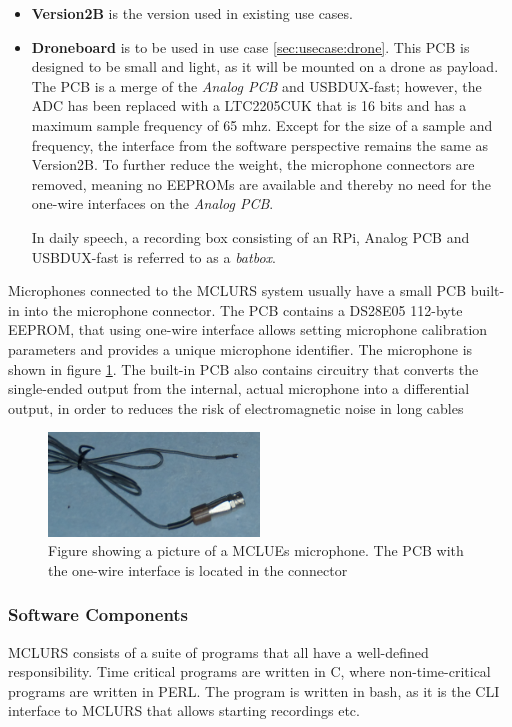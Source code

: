 \begin{itemize}
	\item \textbf{Version2B} is the version used in existing use cases. 

	\item \textbf{Droneboard} is to be used in use case \ref{sec:usecase:drone}. This PCB is designed to be small and light, as it will be mounted on a drone as payload. The PCB is a merge of the \textit{Analog PCB} and USBDUX-fast; however, the ADC has been replaced with a LTC2205CUK\citep{ADC:LTC2205} that is 16 bits and has a maximum sample frequency of 65 mhz. Except for the size of a sample and frequency, the interface from the software perspective remains the same as Version2B. To further reduce the weight, the microphone connectors are removed, meaning no EEPROMs are available and thereby no need for the one-wire interfaces on the \textit{Analog PCB}.

In daily speech, a recording box consisting of an RPi, Analog PCB and USBDUX-fast is referred to as a \textit{batbox}.

\end{itemize}
Microphones connected to the MCLURS system usually have a small PCB built-in into the microphone connector. The PCB contains a DS28E05\citep{EEPROM:DS28E05} 112-byte EEPROM, that using one-wire interface allows setting microphone calibration parameters and provides a unique microphone identifier. The microphone is shown in figure \ref{fig:existingsystem:microphone}. The built-in PCB also contains circuitry that converts the single-ended output from the internal, actual microphone into a differential output, in order to reduces the risk of electromagnetic noise in long cables

\begin{figure}[h!]
	\centering
	\includegraphics[width=0.5\textwidth]{figures/mclurs_microphone}
	\caption{Figure showing a picture of a MCLUEs microphone. The PCB with the one-wire interface is located in the connector}\label{fig:existingsystem:microphone}
\end{figure}
\subsubsection{Software Components} \label{sec:existingsystem:software}
MCLURS consists of a suite of programs that all have a well-defined responsibility. Time critical programs are written in C, where non-time-critical programs are written in PERL.
The  program is written in bash, as it is the CLI interface to MCLURS that allows starting recordings etc.

